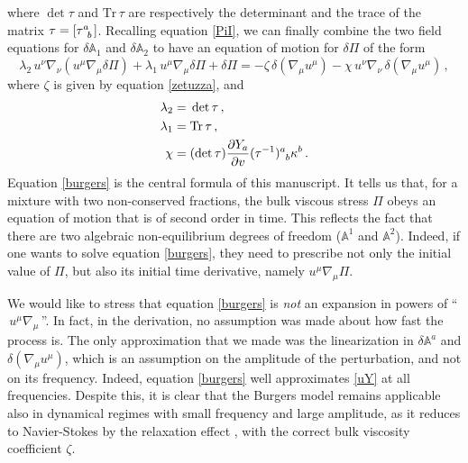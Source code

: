 \documentclass[a4paper, amsfonts, amssymb, amsmath, reprint, showkeys, nofootinbib, twoside, onecolumn,notitlepage]{revtex4-1}
\begin{document}
where $\det \tau$ and $\text{Tr} \, \tau$ are respectively the determinant and the trace of the matrix $\tau=[\tau\indices{^a _b}]$. Recalling equation \eqref{PiI}, we can finally combine the two field equations for $\delta \mathbb{A}_1$ and $\delta \mathbb{A}_2$ to have an equation of motion for $\delta \Pi$ of the form
\begin{equation}\label{burgers}
\lambda_2 \, u^\nu \nabla_\nu (u^\mu \nabla_\mu \delta\Pi) + \lambda_1 \, u^\mu \nabla_\mu \delta \Pi+ \delta \Pi = -\zeta \, \delta(\nabla_\mu  u^\mu) -\chi\, u^\nu \nabla_\nu  \, \delta(\nabla_\mu  u^\mu)\, ,
\end{equation}
where $\zeta$ is given by equation \eqref{zetuzza}, and
\begin{equation}\label{kalibo}
\begin{split}
\lambda_2 ={}& \det \tau \, ,\\
\lambda_1 ={}& \text{Tr} \, \tau \, ,\\
\chi ={}& (\det \tau) \dfrac{\partial Y_a}{\partial v} (\tau^{-1})\indices{^a _b} \kappa^b  \, . \\
\end{split}
\end{equation}
Equation \eqref{burgers} is the central formula of this manuscript. It tells us that, for a mixture with two non-conserved fractions, the bulk viscous stress $\Pi$ obeys an equation of motion that is of second order in time. This reflects the fact that there are two algebraic non-equilibrium degrees of freedom ($\mathbb{A}^1$ and $\mathbb{A}^2$). Indeed, if one wants to solve equation \eqref{burgers}, they need to prescribe not only the initial value of $\Pi$, but also its initial time derivative, namely $u^\mu \nabla_\mu \Pi$. 

We would like to stress that equation \eqref{burgers} is \textit{not} an expansion in powers of ``$\, u^\mu \nabla_\mu \,$''. In fact, in the derivation, no assumption was made about how fast the process is. The only approximation that we made was the linearization in $\delta \mathbb{A}^a$ and $\delta (\nabla_\mu u^\mu)$, which is an assumption on the amplitude of the perturbation, and not on its frequency. Indeed, equation \eqref{burgers} well approximates \eqref{uY} at all frequencies. Despite this, it is clear that the Burgers model remains applicable also in dynamical regimes with small frequency and large amplitude, as it reduces to Navier-Stokes by the relaxation effect \cite{LindblomRelaxation1996}, with the correct bulk viscosity coefficient $\zeta$.
\end{document}
